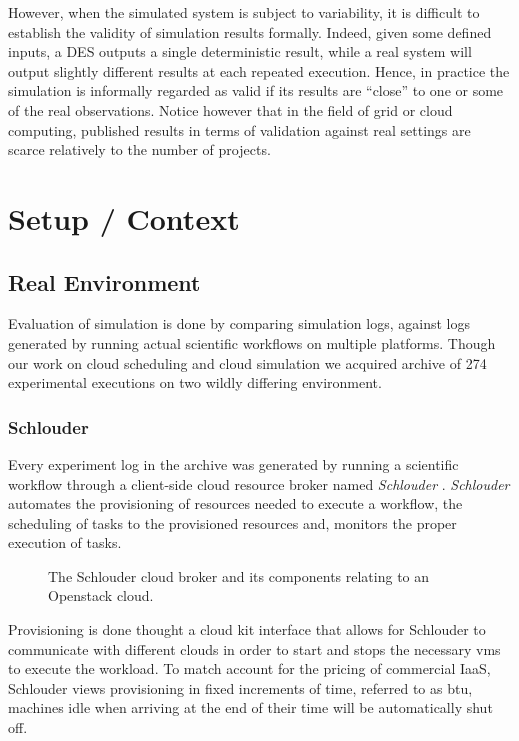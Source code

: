 \documentclass[a4paper,10pt]{article}
\begin{document}
However, when the simulated system is subject to variability, it is difficult to
establish  the  validity of  simulation  results  formally. Indeed,  given  some
defined inputs, a DES outputs a single deterministic result, while a real system
will output  slightly different results  at each repeated execution.   Hence, in
practice  the simulation  is informally  regarded as  valid if  its results  are
``close'' to one or  some of the real observations.  Notice  however that in the
field  of grid  or cloud  computing, published  results in  terms of  validation
against real settings are scarce relatively to the number of projects.

\section{Setup / Context}


\subsection{Real Environment}

Evaluation of simulation is done by comparing simulation logs, against logs
generated by running actual scientific workflows on multiple platforms. Though
our work on cloud scheduling and cloud simulation we acquired archive of 274
experimental executions on two wildly differing environment.

\subsubsection{Schlouder}

Every experiment log in the archive was generated by running a scientific
workflow through a client-side cloud resource broker named \emph{Schlouder}
\cite{Michon17}. \emph{Schlouder} automates the provisioning of resources needed
to execute a workflow, the scheduling of tasks to the provisioned resources and,
monitors the proper execution of tasks. 

\begin{figure}
	\centering
	
	\caption{The Schlouder cloud broker and its components relating to an
	Openstack cloud.}
\end{figure}


Provisioning is done thought a cloud  kit interface that allows for Schlouder to
communicate with  different clouds  in order  to start  and stops  the necessary
\acp{vm}  to  execute  the  workload.   To match  account  for  the  pricing  of
commercial  IaaS, Schlouder  views  provisioning in  fixed  increments of  time,
referred to as  \ac{btu}, machines idle when  arriving at the end  of their time
will be automatically shut off.
\end{document}
